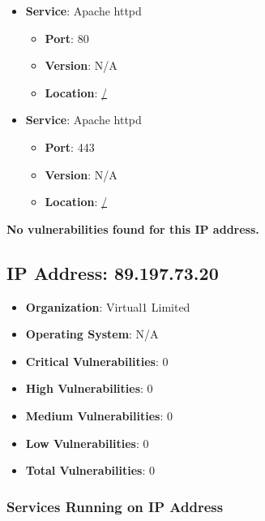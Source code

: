 \documentclass{article}
\begin{document}
\begin{itemize}
    
        \item \textbf{Service}: Apache httpd
        \begin{itemize}
            \item \textbf{Port}: 80
            \item \textbf{Version}:  N/A 
            \item \textbf{Location}: \href{ / }{ / }
        \end{itemize}
    
        \item \textbf{Service}: Apache httpd
        \begin{itemize}
            \item \textbf{Port}: 443
            \item \textbf{Version}:  N/A 
            \item \textbf{Location}: \href{ / }{ / }
        \end{itemize}
    
\end{itemize}


\textbf{No vulnerabilities found for this IP address.}




\clearpage



\subsection{IP Address: 89.197.73.20}

\begin{itemize}
    \item \textbf{Organization}: Virtual1 Limited
    \item \textbf{Operating System}:  N/A 
    \item \textbf{Critical Vulnerabilities}: 0
    \item \textbf{High Vulnerabilities}: 0
    \item \textbf{Medium Vulnerabilities}: 0
    \item \textbf{Low Vulnerabilities}: 0
    \item \textbf{Total Vulnerabilities}: 0
\end{itemize}

\subsubsection*{Services Running on IP Address}
\end{document}
